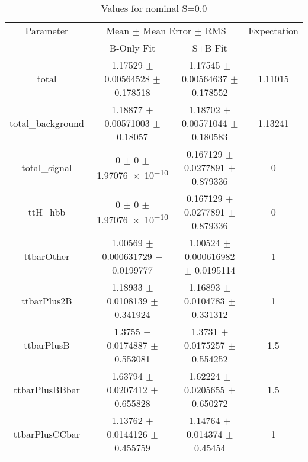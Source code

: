 \begin{table}
\centering
\caption{Values for nominal S=0.0}
\begin{tabular}{cccc}
\toprule
Parameter & \multicolumn{2}{c}{Mean $\pm$ Mean Error $\pm$ RMS} & Expectation\\
 & B-Only Fit & S+B Fit & \\
\midrule
total & \num{1.17529} $\pm$ \num{0.00564528} $\pm$ \num{0.178518} & \num{1.17545} $\pm$ \num{0.00564637} $\pm$ \num{0.178552} & \num{1.11015}\\
total\_background & \num{1.18877} $\pm$ \num{0.00571003} $\pm$ \num{0.18057} & \num{1.18702} $\pm$ \num{0.00571044} $\pm$ \num{0.180583} & \num{1.13241}\\
total\_signal & \num{0} $\pm$ \num{0} $\pm$ \num{1.97076e-10} & \num{0.167129} $\pm$ \num{0.0277891} $\pm$ \num{0.879336} & \num{0}\\
ttH\_hbb & \num{0} $\pm$ \num{0} $\pm$ \num{1.97076e-10} & \num{0.167129} $\pm$ \num{0.0277891} $\pm$ \num{0.879336} & \num{0}\\
ttbarOther & \num{1.00569} $\pm$ \num{0.000631729} $\pm$ \num{0.0199777} & \num{1.00524} $\pm$ \num{0.000616982} $\pm$ \num{0.0195114} & \num{1}\\
ttbarPlus2B & \num{1.18933} $\pm$ \num{0.0108139} $\pm$ \num{0.341924} & \num{1.16893} $\pm$ \num{0.0104783} $\pm$ \num{0.331312} & \num{1}\\
ttbarPlusB & \num{1.3755} $\pm$ \num{0.0174887} $\pm$ \num{0.553081} & \num{1.3731} $\pm$ \num{0.0175257} $\pm$ \num{0.554252} & \num{1.5}\\
ttbarPlusBBbar & \num{1.63794} $\pm$ \num{0.0207412} $\pm$ \num{0.655828} & \num{1.62224} $\pm$ \num{0.0205655} $\pm$ \num{0.650272} & \num{1.5}\\
ttbarPlusCCbar & \num{1.13762} $\pm$ \num{0.0144126} $\pm$ \num{0.455759} & \num{1.14764} $\pm$ \num{0.014374} $\pm$ \num{0.45454} & \num{1}\\
\bottomrule
\end{tabular}
\end{table}